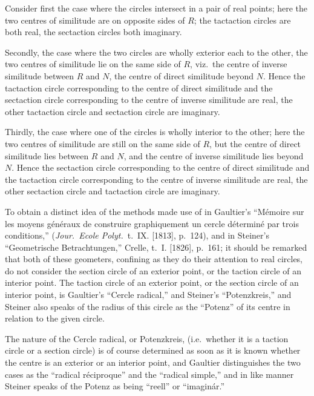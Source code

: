 \documentclass[11pt,a4paper]{book}
\begin{document}
Consider first the case where the circles intersect in a pair of real points; here the two centres of similitude are on opposite sides of $R$; the tactaction circles are both real, the sectaction circles both imaginary.

Secondly, the case where the two circles are wholly exterior each to the other, the two centres of similitude lie on the same side of $R$, viz.\ the centre of inverse similitude between $R$ and $N$, the centre of direct similitude beyond $N$. Hence the tactaction circle corresponding to the centre of direct similitude and the sectaction circle corresponding to the centre of inverse similitude are real, the other tactaction circle and sectaction circle are imaginary.

Thirdly, the case where one of the circles is wholly interior to the other; here the two centres of similitude are still on the same side of $R$, but the centre of direct similitude lies between $R$ and $N$, and the centre of inverse similitude lies beyond $N$. Hence the sectaction circle corresponding to the centre of direct similitude and the tactaction circle corresponding to the centre of inverse similitude are real, the other sectaction circle and tactaction circle are imaginary.

\newpage
[183]

To obtain a distinct idea of the methods made use of in Gaultier's ``M\'{e}moire sur les moyens g\'{e}n\'{e}raux de construire graphiquement un cercle d\'{e}termin\'{e} par trois conditions,'' (\textit{Jour.\ Ecole Polyt.}\ t.~IX. [1813], p.~124), and in Steiner's ``Geometrische Betrachtungen,'' Crelle, t.~I. [1826], p.~161; it should be remarked that both of these geometers, confining as they do their attention to real circles, do not consider the section circle of an exterior point, or the taction circle of an interior point. The taction circle of an exterior point, or the section circle of an interior point, is Gaultier's ``Cercle radical,'' and Steiner's ``Potenzkreis,'' and Steiner also speaks of the radius of this circle as the ``Potenz'' of its centre in relation to the given circle.

The nature of the Cercle radical, or Potenzkreis, (i.e.\ whether it is a taction circle or a section circle) is of course determined as soon as it is known whether the centre is an exterior or an interior point, and Gaultier distinguishes the two cases as the ``radical r\'{e}ciproque'' and the ``radical simple,'' and in like manner Steiner speaks of the Potenz as being ``reell'' or ``imagin\'{a}r.''
\end{document}
